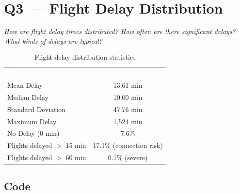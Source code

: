 \documentclass[12pt, a4paper]{report}
\newcommand{\thead}[1]{\cellcolor{themeHeaderBg}\textcolor{white}{\textbf{#1}}}
\newcommand{\talt}{\rowcolor{themeRowAlt}}
\newcommand{\trow}{\rowcolor{white}}
\begin{document}
\chapter{Q3 — Flight Delay Distribution}

\textit{How are flight delay times distributed? How often are there significant delays? What kinds of delays are typical?}

\begin{table}[H]
\centering
\renewcommand{\arraystretch}{1.3}
\begin{tabular}{lc}
\thead{Metric} & \thead{Value} \\
\talt Mean Delay                   & 13.61 min \\
\trow Median Delay                 & 10.00 min \\
\talt Standard Deviation           & 47.76 min \\
\trow Maximum Delay                & 1,524 min \\
\talt No Delay (0 min)             & 7.6\% \\
\trow Flights delayed $>$ 15 min   & 17.1\% (connection risk) \\
\talt Flights delayed $>$ 60 min   & 0.1\% (severe) \\
\end{tabular}
\caption{Flight delay distribution statistics}
\end{table}

\section{Code}
\end{document}
